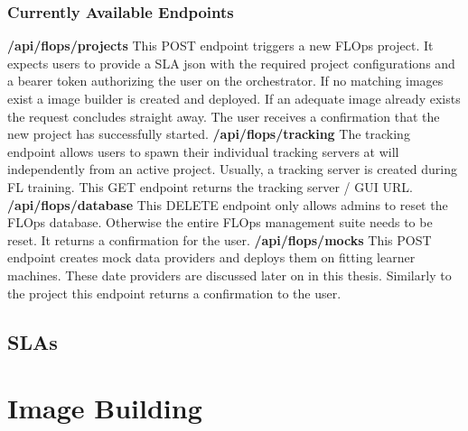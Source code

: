     \subsubsection{Currently Available Endpoints}
        \textbf{/api/flops/projects}\newline
        This POST endpoint triggers a new FLOps project.
        It expects users to provide a SLA json with the required project configurations and a bearer token authorizing the user on the orchestrator.
        If no matching images exist a image builder is created and deployed.
        If an adequate image already exists the request concludes straight away.
        The user receives a confirmation that the new project has successfully started.
        \vspace{5mm}
        \newline
        \textbf{/api/flops/tracking}\newline
        The tracking endpoint allows users to spawn their individual tracking servers at will independently from an active project.
        Usually, a tracking server is created during FL training.
        This GET endpoint returns the tracking server / GUI URL.
        \vspace{5mm}
        \newline
        \textbf{/api/flops/database}\newline
        This DELETE endpoint only allows admins to reset the FLOps database.
        Otherwise the entire FLOps management suite needs to be reset.
        It returns a confirmation for the user.
        \vspace{5mm}
        \newline
        \textbf{/api/flops/mocks}\newline
        This POST endpoint creates mock data providers and deploys them on fitting learner machines.
        These date providers are discussed later on in this thesis.
        Similarly to the project this endpoint returns a confirmation to the user.
        \vspace{5mm}
        \newline

    \subsection{SLAs}


\section{Image Building}

